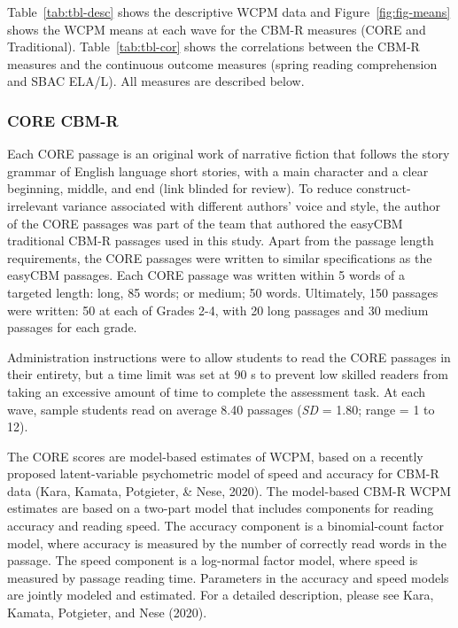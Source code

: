 \documentclass[
  english,
  man, fleqn, noextraspace]{apa6}
\begin{document}
Table~\ref{tab:tbl-desc} shows the descriptive WCPM data and Figure~\ref{fig:fig-means} shows the WCPM means at each wave for the CBM-R measures (CORE and Traditional). Table~\ref{tab:tbl-cor} shows the correlations between the CBM-R measures and the continuous outcome measures (spring reading comprehension and SBAC ELA/L). All measures are described below.

\hypertarget{core-cbm-r}{%
\subsubsection{CORE CBM-R}\label{core-cbm-r}}

Each CORE passage is an original work of narrative fiction that follows the story grammar of English language short stories, with a main character and a clear beginning, middle, and end (link blinded for review). To reduce construct-irrelevant variance associated with different authors' voice and style, the author of the CORE passages was part of the team that authored the easyCBM traditional CBM-R passages used in this study. Apart from the passage length requirements, the CORE passages were written to similar specifications as the easyCBM passages. Each CORE passage was written within 5 words of a targeted length: long, 85 words; or medium; 50 words. Ultimately, 150 passages were written: 50 at each of Grades 2-4, with 20 long passages and 30 medium passages for each grade.

Administration instructions were to allow students to read the CORE passages in their entirety, but a time limit was set at 90 s to prevent low skilled readers from taking an excessive amount of time to complete the assessment task. At each wave, sample students read on average 8.40 passages (\emph{SD} = 1.80; range = 1 to 12).

The CORE scores are model-based estimates of WCPM, based on a recently proposed latent-variable psychometric model of speed and accuracy for CBM-R data (Kara, Kamata, Potgieter, \& Nese, 2020). The model-based CBM-R WCPM estimates are based on a two-part model that includes components for reading accuracy and reading speed. The accuracy component is a binomial-count factor model, where accuracy is measured by the number of correctly read words in the passage. The speed component is a log-normal factor model, where speed is measured by passage reading time. Parameters in the accuracy and speed models are jointly modeled and estimated. For a detailed description, please see Kara, Kamata, Potgieter, and Nese (2020).
\end{document}

